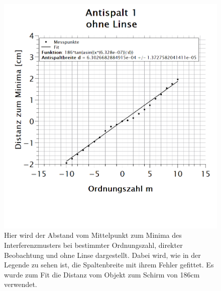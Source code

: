 \begin{figure}[h]
\centering
\includegraphics[width=\textwidth]{Bilder/antispalt1_ohneLinse.png}
\vspace*{-3.5cm}
\caption[Antispalt 1: ohne Linse]{Hier wird der Abstand vom Mittelpunkt zum Minima des Interferenzmusters bei bestimmter Ordnungszahl, direkter Beobachtung und ohne Linse dargestellt. Dabei wird, wie in der Legende zu sehen ist, die Spaltenbreite mit ihrem Fehler gefittet. Es wurde zum Fit die Distanz vom Objekt zum Schirm von 186cm verwendet.}
\label{fig:antispalt1_ohneLinse}
\end{figure}
\newpage

